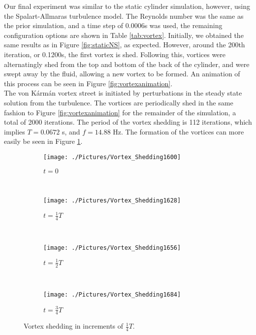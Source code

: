 \documentclass[10pt, titlepage]{article}
\begin{document}
Our final experiment was similar to the static cylinder simulation, however, using the Spalart-Allmaras turbulence model. The Reynolds number was the same as the prior simulation, and a time step of 0.0006s was used, the remaining configuration options are  shown in Table \ref{tab:vortex}. Initially, we obtained the same results as in Figure \ref{fig:staticNS}, as expected. However, around the 200th iteration, or 0.1200s, the first vortex is shed. Following this, vortices were alternatingly shed from the top and bottom of the back of the cylinder, and were swept away by the fluid, allowing a new vortex to be formed. An animation of this process can be seen in Figure \ref{fig:vortexanimation}. \\

The von K\'{a}rm\'{a}n vortex street is initiated by perturbations in the steady state solution from the turbulence. The vortices are periodically shed in the same fashion to Figure \ref{fig:vortexanimation} for the remainder of the simulation, a total of 2000 iterations. The period of the vortex shedding is 112 iterations, which implies $T = 0.0672$ s, and $f = 14.88$ Hz. The formation of the vortices can more easily be seen in Figure \ref{fig:vortexstill}.

\begin{figure}
\begin{subfigure}{\linewidth}
  \centering
  \texttt{[image: ./Pictures/Vortex\_Shedding1600]}
  \caption{$t = 0$}
\end{subfigure} \\
\begin{subfigure}{\textwidth}
  \centering
  \texttt{[image: ./Pictures/Vortex\_Shedding1628]}
  \caption{$t = \frac{1}{4}T$}
\end{subfigure} \\
\begin{subfigure}{\linewidth}
  \centering
  \texttt{[image: ./Pictures/Vortex\_Shedding1656]}
  \caption{$t = \frac{1}{2}T$}
\end{subfigure} \\
\begin{subfigure}{\textwidth}
  \centering
  \texttt{[image: ./Pictures/Vortex\_Shedding1684]}
  \caption{$t = \frac{3}{4}T$}
\end{subfigure}
\caption[Vortex Shedding at $\frac{1}{4}T$ Increments]{Vortex shedding in increments of $\frac{1}{4}T$.}
\label{fig:vortexstill}
\end{figure}
\end{document}
